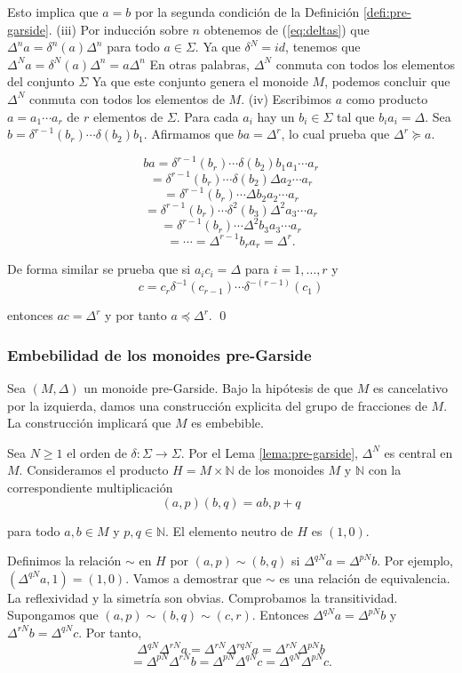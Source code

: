 \documentclass[12pt]{article}
\theoremstyle{definition}
\begin{document}
Esto implica que $a=b$ por la segunda condición de la Definición \ref{defi:pre-garside}.
\newline
\newline
(iii) Por inducción sobre $n$ obtenemos de (\ref{eq:deltas}) que $\Delta^na=\delta^n(a)\Delta^n$ para todo $a\in\Sigma$. Ya que $\delta^N=id$, tenemos que $\Delta^N a=\delta^N(a)\Delta^n=a\Delta^n$ En otras palabras, $\Delta^N$ conmuta con todos los elementos del conjunto $\Sigma$ Ya que este conjunto genera el monoide $M$, podemos concluir que $\Delta^N$ conmuta con todos los elementos de $M$.
\newline
\newline
(iv) Escribimos $a$ como producto $a=a_1\cdots a_r$ de $r$ elementos de $\Sigma$. Para cada $a_i$ hay un $b_i\in\Sigma$ tal que $b_ia_i=\Delta$. Sea $b=\delta^{r-1}(b_r)\cdots\delta(b_2)b_1$. Afirmamos que $ba=\Delta^r$, lo cual prueba que $\Delta^r\succeq a$.

$$ba=\delta^{r-1}(b_r)\cdots\delta(b_2)b_1a_1\cdots a_r$$
$$=\delta^{r-1}(b_r)\cdots\delta(b_2)\Delta a_2\cdots a_r$$
$$=\delta^{r-1}(b_r)\cdots\Delta b_2a_2\cdots a_r$$
$$=\delta^{r-1}(b_r)\cdots\delta^2(b_3)\Delta^2 a_3\cdots a_r$$
$$=\delta^{r-1}(b_r)\cdots\Delta^2 b_3a_3\cdots a_r$$
$$=\cdots= \Delta^{r-1}b_ra_r=\Delta^r.$$

De forma similar se prueba que si $a_ic_i=\Delta$ para $i=1,\ldots,r$ y
$$c=c_r\delta^{-1}(c_{r-1})\cdots\delta^{-(r-1)}(c_1)$$

entonces $ac=\Delta^r$ y por tanto $a\preceq\Delta^r$. \qed

\subsubsection{Embebilidad de los monoides pre-Garside}

Sea $(M,\Delta)$ un monoide pre-Garside. Bajo la hipótesis de que $M$ es cancelativo por la izquierda, damos una construcción explicita del grupo de fracciones de $M$. La construcción implicará que $M$ es embebible.

Sea $N\geq 1$ el orden de $\delta:\Sigma\rightarrow\Sigma$. Por el Lema \ref{lema:pre-garside}, $\Delta^N$ es central en $M$. Consideramos el producto $H=M\times\mathbb{N}$ de los monoides $M$ y $\mathbb{N}$ con la correspondiente multiplicación
$$(a,p)(b,q)=ab,p+q$$

para todo $a,b\in M$ y $p,q\in\mathbb{N}$. El elemento neutro de $H$ es $(1,0)$.

Definimos la relación $\sim$ en $H$ por $(a,p)\sim(b,q)$ si $\Delta^{qN}a=\Delta^{pN}b$. Por ejemplo, $(\Delta^{qN}a,1)=(1,0)$. Vamos a demostrar que $\sim$ es una relación de equivalencia. La reflexividad y la simetría son obvias. Comprobamos la transitividad. Supongamos que $(a,p)\sim(b,q)\sim(c,r)$. Entonces $\Delta^{qN}a=\Delta^{pN}b$ y $\Delta^{rN}b=\Delta^{qN}c$. Por tanto,
$$\Delta^{qN}\Delta^{rN}a=\Delta^{rN}\Delta^{rqN}a=\Delta^{rN}\Delta^{pN}b$$
$$=\Delta^{pN}\Delta^{rN}b=\Delta^{pN}\Delta^{qN}c=\Delta^{qN}\Delta^{pN}c.$$
\end{document}
